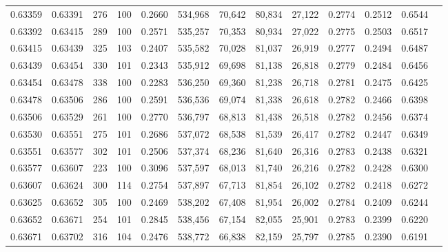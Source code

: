 \begin{tabular}{rrrrrrrrrrrrr}
0.63359 & 0.63391 &   276 & 100 &                                     0.2660 & 534,968 &  70,642 &  80,834 &  27,122 & 0.2774 & 0.2512 & 0.6544 \\
0.63392 & 0.63415 &   289 & 100 &                                     0.2571 & 535,257 &  70,353 &  80,934 &  27,022 & 0.2775 & 0.2503 & 0.6517 \\
0.63415 & 0.63439 &   325 & 103 &                                     0.2407 & 535,582 &  70,028 &  81,037 &  26,919 & 0.2777 & 0.2494 & 0.6487 \\
0.63439 & 0.63454 &   330 & 101 &                                     0.2343 & 535,912 &  69,698 &  81,138 &  26,818 & 0.2779 & 0.2484 & 0.6456 \\
0.63454 & 0.63478 &   338 & 100 &                                     0.2283 & 536,250 &  69,360 &  81,238 &  26,718 & 0.2781 & 0.2475 & 0.6425 \\
0.63478 & 0.63506 &   286 & 100 &                                     0.2591 & 536,536 &  69,074 &  81,338 &  26,618 & 0.2782 & 0.2466 & 0.6398 \\
0.63506 & 0.63529 &   261 & 100 &                                     0.2770 & 536,797 &  68,813 &  81,438 &  26,518 & 0.2782 & 0.2456 & 0.6374 \\
0.63530 & 0.63551 &   275 & 101 &                                     0.2686 & 537,072 &  68,538 &  81,539 &  26,417 & 0.2782 & 0.2447 & 0.6349 \\
0.63551 & 0.63577 &   302 & 101 &                                     0.2506 & 537,374 &  68,236 &  81,640 &  26,316 & 0.2783 & 0.2438 & 0.6321 \\
0.63577 & 0.63607 &   223 & 100 &                                     0.3096 & 537,597 &  68,013 &  81,740 &  26,216 & 0.2782 & 0.2428 & 0.6300 \\
0.63607 & 0.63624 &   300 & 114 &                                     0.2754 & 537,897 &  67,713 &  81,854 &  26,102 & 0.2782 & 0.2418 & 0.6272 \\
0.63625 & 0.63652 &   305 & 100 &                                     0.2469 & 538,202 &  67,408 &  81,954 &  26,002 & 0.2784 & 0.2409 & 0.6244 \\
0.63652 & 0.63671 &   254 & 101 &                                     0.2845 & 538,456 &  67,154 &  82,055 &  25,901 & 0.2783 & 0.2399 & 0.6220 \\
0.63671 & 0.63702 &   316 & 104 &                                     0.2476 & 538,772 &  66,838 &  82,159 &  25,797 & 0.2785 & 0.2390 & 0.6191 \\

\end{tabular}
